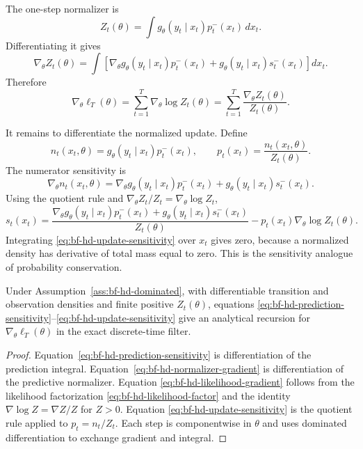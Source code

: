 The one-step normalizer is
\begin{equation}
  Z_t(\theta)=\int g_\theta(y_t\mid x_t)p_t^-(x_t)\,dx_t .
  \label{eq:bf-hd-gradient-normalizer}
\end{equation}
Differentiating it gives
\begin{equation}
  \nabla_\theta Z_t(\theta)
  =
  \int
  \left[
  \nabla_\theta g_\theta(y_t\mid x_t)p^-_t(x_t)
  +
  g_\theta(y_t\mid x_t)s^-_t(x_t)
  \right]dx_t .
  \label{eq:bf-hd-normalizer-gradient}
\end{equation}
Therefore
\begin{equation}
  \nabla_\theta \ell_T(\theta)
  =
  \sum_{t=1}^T
  \nabla_\theta \log Z_t(\theta)
  =
  \sum_{t=1}^T
  \frac{\nabla_\theta Z_t(\theta)}{Z_t(\theta)} .
  \label{eq:bf-hd-likelihood-gradient}
\end{equation}

It remains to differentiate the normalized update.  Define
\[
  n_t(x_t,\theta)=g_\theta(y_t\mid x_t)p_t^-(x_t),
  \qquad
  p_t(x_t)=\frac{n_t(x_t,\theta)}{Z_t(\theta)}.
\]
The numerator sensitivity is
\begin{equation}
  \nabla_\theta n_t(x_t,\theta)
  =
  \nabla_\theta g_\theta(y_t\mid x_t)p_t^-(x_t)
  +
  g_\theta(y_t\mid x_t)s_t^-(x_t).
\end{equation}
Using the quotient rule and
\(\nabla_\theta Z_t/Z_t=\nabla_\theta\log Z_t\),
\begin{equation}
  s_t(x_t)
  =
  \frac{
  \nabla_\theta g_\theta(y_t\mid x_t)p^-_t(x_t)
  +
  g_\theta(y_t\mid x_t)s^-_t(x_t)
  }{Z_t(\theta)}
  -
  p_t(x_t)\nabla_\theta\log Z_t(\theta).
  \label{eq:bf-hd-update-sensitivity}
\end{equation}
Integrating \eqref{eq:bf-hd-update-sensitivity} over \(x_t\) gives zero,
because a normalized density has derivative of total mass equal to zero.  This
is the sensitivity analogue of probability conservation.

\begin{proposition}
\label{prop:bf-hd-likelihood-sensitivity}
Under Assumption~\ref{ass:bf-hd-dominated}, with differentiable transition and
observation densities and finite positive \(Z_t(\theta)\), equations
\eqref{eq:bf-hd-prediction-sensitivity}--\eqref{eq:bf-hd-update-sensitivity}
give an analytical recursion for \(\nabla_\theta\ell_T(\theta)\) in the exact
discrete-time filter.
\end{proposition}

\begin{proof}
Equation~\eqref{eq:bf-hd-prediction-sensitivity} is differentiation of the
prediction integral.  Equation~\eqref{eq:bf-hd-normalizer-gradient} is
differentiation of the predictive normalizer.  Equation
\eqref{eq:bf-hd-likelihood-gradient} follows from the likelihood factorization
\eqref{eq:bf-hd-likelihood-factor} and the identity
\(\nabla\log Z=\nabla Z/Z\) for \(Z>0\).  Equation
\eqref{eq:bf-hd-update-sensitivity} is the quotient rule applied to
\(p_t=n_t/Z_t\).  Each step is componentwise in \(\theta\) and uses dominated
differentiation to exchange gradient and integral.
\end{proof}

